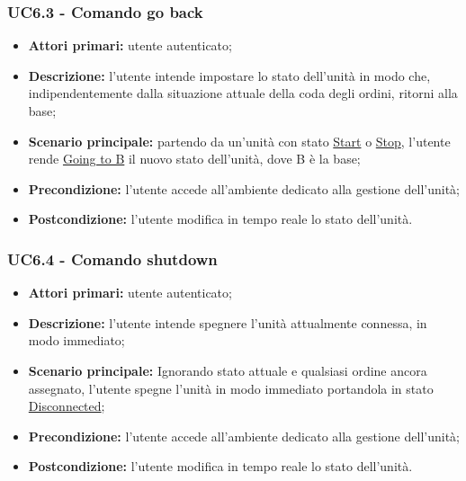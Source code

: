         \subsubsection{UC6.3 - Comando go back}
        \begin{itemize}
            \item \textbf{Attori primari:} utente autenticato;
            \item \textbf{Descrizione:} l'utente intende impostare lo stato dell'unità in modo che, indipendentemente dalla situazione attuale della coda degli ordini, ritorni alla base;
            \item \textbf{Scenario principale:} partendo da un'unità con stato \underline{Start} o \underline{Stop}, l'utente rende \underline{Going to B} il nuovo stato dell'unità, dove B è la base;
            \item \textbf{Precondizione:} l'utente accede all'ambiente dedicato alla gestione dell'unità;
            \item \textbf{Postcondizione:} l'utente modifica in tempo reale lo stato dell'unità.
        \end{itemize}

        \subsubsection{UC6.4 - Comando shutdown}
        \begin{itemize}
            \item \textbf{Attori primari:} utente autenticato;
            \item \textbf{Descrizione:} l'utente intende spegnere l'unità attualmente connessa, in modo immediato;
            \item \textbf{Scenario principale:} Ignorando stato attuale e qualsiasi ordine ancora assegnato, l'utente spegne l'unità in modo immediato portandola in stato \underline{Disconnected};
            \item \textbf{Precondizione:} l'utente accede all'ambiente dedicato alla gestione dell'unità;
            \item \textbf{Postcondizione:} l'utente modifica in tempo reale lo stato dell'unità.
        \end{itemize}

